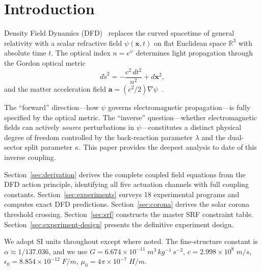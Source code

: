 \documentclass[aps,prd,twocolumn,superscriptaddress,floatfix,nofootinbib]{revtex4-2}
\newcommand{\avec}{\mathbf{a}}
\begin{document}
\section{Introduction}\label{sec:intro}

Density Field Dynamics (DFD)~\cite{Alcock2025DFD} replaces the curved
spacetime of general relativity with a scalar refractive field
$\psi(\mathbf{x}, t)$ on flat Euclidean space $\mathbb{R}^3$ with
absolute time $t$. The optical index $n = e^\psi$ determines light
propagation through the Gordon optical metric
\begin{equation}
d\tilde{s}^2 = -\frac{c^2\,dt^2}{n^2} + d\mathbf{x}^2,
\label{eq:optical-metric}
\end{equation}
and the matter acceleration field
$\avec = (c^2/2)\nabla\psi$~\cite{Alcock2025DFD}.

The ``forward'' direction---how $\psi$ governs electromagnetic
propagation---is fully specified by the optical metric. The ``inverse''
question---whether electromagnetic fields can actively \emph{source}
perturbations in $\psi$---constitutes a distinct physical degree of
freedom controlled by the back-reaction parameter $\lambda$ and the
dual-sector split parameter $\kappa$. This paper provides the deepest
analysis to date of this inverse coupling.

Section~\ref{sec:derivation} derives the complete coupled field equations
from the DFD action principle, identifying all five actuation channels
with full coupling constants. Section~\ref{sec:experiments} surveys
18 experimental programs and computes exact DFD predictions.
Section~\ref{sec:corona} derives the solar corona threshold crossing.
Section~\ref{sec:srf} constructs the master SRF constraint table.
Section~\ref{sec:experiment-design} presents the definitive experiment
design.

We adopt SI units throughout except where noted. The fine-structure
constant is $\alpha \approx 1/137.036$, and we use
$G = 6.674 \times 10^{-11}\;\si{m^3\,kg^{-1}\,s^{-2}}$,
$c = 2.998 \times 10^8\;\si{m/s}$,
$\epsilon_0 = 8.854 \times 10^{-12}\;\si{F/m}$,
$\mu_0 = 4\pi \times 10^{-7}\;\si{H/m}$.


\end{document}
